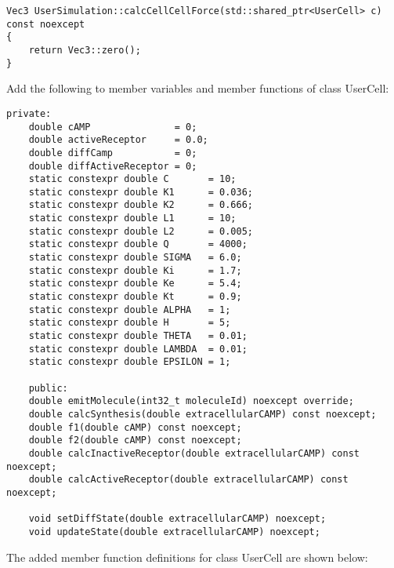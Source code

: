 \documentclass[vipdfmx,a4paper,11pt]{jsarticle}
\begin{document}
\begin{lstlisting}[caption=calcCellCellForce()]
Vec3 UserSimulation::calcCellCellForce(std::shared_ptr<UserCell> c) const noexcept
{
    return Vec3::zero();
}
\end{lstlisting}

Add the following to member variables and member functions of class UserCell:

\begin{lstlisting}[caption=class UserCell(UserCell.hpp)]
    private:
    double cAMP               = 0;
    double activeReceptor     = 0.0;
    double diffCamp           = 0;
    double diffActiveReceptor = 0;
    static constexpr double C       = 10;
    static constexpr double K1      = 0.036;
    static constexpr double K2      = 0.666;
    static constexpr double L1      = 10;
    static constexpr double L2      = 0.005;
    static constexpr double Q       = 4000;
    static constexpr double SIGMA   = 6.0;
    static constexpr double Ki      = 1.7;
    static constexpr double Ke      = 5.4;
    static constexpr double Kt      = 0.9;
    static constexpr double ALPHA   = 1;
    static constexpr double H       = 5;
    static constexpr double THETA   = 0.01;
    static constexpr double LAMBDA  = 0.01;
    static constexpr double EPSILON = 1;

    public:
    double emitMolecule(int32_t moleculeId) noexcept override;
    double calcSynthesis(double extracellularCAMP) const noexcept;
    double f1(double cAMP) const noexcept;
    double f2(double cAMP) const noexcept;
    double calcInactiveReceptor(double extracellularCAMP) const noexcept;
    double calcActiveReceptor(double extracellularCAMP) const noexcept;

    void setDiffState(double extracellularCAMP) noexcept;
    void updateState(double extracellularCAMP) noexcept;
\end{lstlisting}

The added member function definitions for class UserCell are shown below:
\end{document}
